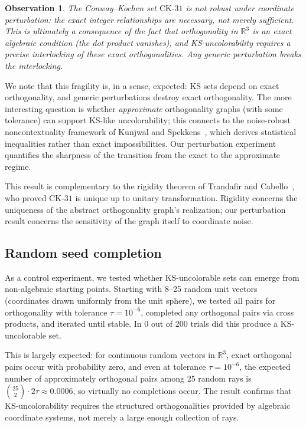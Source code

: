 \documentclass[12pt,a4paper]{article}
\newtheorem{observation}[theorem]{Observation}
\newcommand{\R}{\mathbb{R}}
\newcommand{\CK}{\mathrm{CK}\text{-}31}
\begin{document}
\begin{observation}\label{obs:knifeedge}
The Conway--Kochen set $\CK$ is not robust under coordinate perturbation: the exact integer relationships are necessary, not merely sufficient. This is ultimately a consequence of the fact that orthogonality in $\R^3$ is an exact algebraic condition (the dot product vanishes), and KS-uncolorability requires a precise interlocking of these exact orthogonalities. Any generic perturbation breaks the interlocking.
\end{observation}

We note that this fragility is, in a sense, expected: KS sets depend on exact orthogonality, and generic perturbations destroy exact orthogonality. The more interesting question is whether \emph{approximate} orthogonality graphs (with some tolerance) can support KS-like uncolorability; this connects to the noise-robust noncontextuality framework of Kunjwal and Spekkens~\cite{KunjwalSpekkens2018}, which derives statistical inequalities rather than exact impossibilities. Our perturbation experiment quantifies the sharpness of the transition from the exact to the approximate regime.

This result is complementary to the rigidity theorem of Trandafir and Cabello~\cite{TrandafirCabello2025}, who proved $\CK$ is unique up to unitary transformation. Rigidity concerns the uniqueness of the abstract orthogonality graph's realization; our perturbation result concerns the sensitivity of the graph itself to coordinate noise.

\subsection{Random seed completion}

As a control experiment, we tested whether KS-uncolorable sets can emerge from non-algebraic starting points. Starting with 8--25 random unit vectors (coordinates drawn uniformly from the unit sphere), we tested all pairs for orthogonality with tolerance $\tau = 10^{-6}$, completed any orthogonal pairs via cross products, and iterated until stable. In 0 out of 200 trials did this produce a KS-uncolorable set.

This is largely expected: for continuous random vectors in $\R^3$, exact orthogonal pairs occur with probability zero, and even at tolerance $\tau = 10^{-6}$, the expected number of approximately orthogonal pairs among 25 random rays is $\binom{25}{2} \cdot 2\tau \approx 0.0006$, so virtually no completions occur. The result confirms that KS-uncolorability requires the structured orthogonalities provided by algebraic coordinate systems, not merely a large enough collection of rays.
\end{document}
